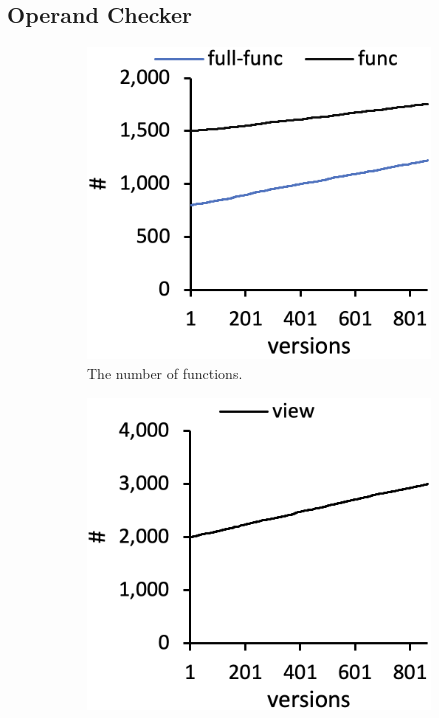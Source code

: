 \subsection{Operand Checker}

\begin{figure}
  \centering
  \begin{subfigure}[b]{0.24\textwidth}
    \includegraphics[width=\textwidth]{img/func}
    \caption{The number of functions.}
  \end{subfigure}
  \begin{subfigure}[b]{0.24\textwidth}
    \includegraphics[width=\textwidth]{img/view}

\end{subfigure}
\end{figure}
